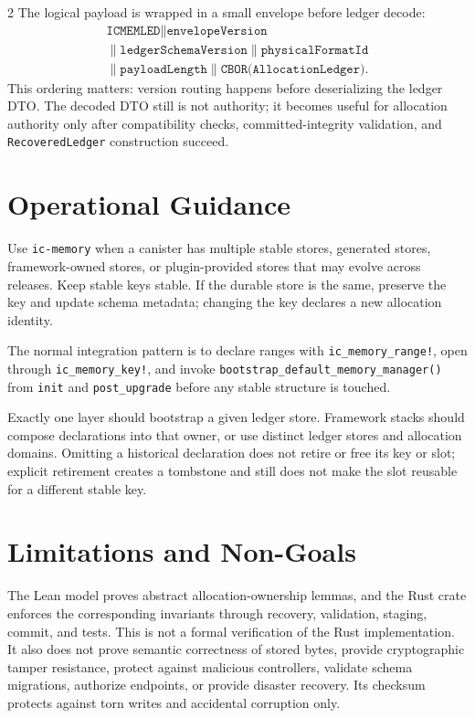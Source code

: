 \documentclass[11pt]{article}
\begin{document}
\begin{multicols}{2}
The logical payload is wrapped in a small envelope before ledger decode:
\[
  \begin{gathered}
  \texttt{ICMEMLED}
  \parallel \texttt{envelopeVersion}\\
  \parallel \texttt{ledgerSchemaVersion}
  \parallel \texttt{physicalFormatId}\\
  \parallel \texttt{payloadLength}
  \parallel
  \texttt{CBOR(AllocationLedger)}.
  \end{gathered}
\]
This ordering matters: version routing happens before deserializing the ledger
DTO. The decoded DTO still is not authority; it becomes useful for allocation
authority only after compatibility checks, committed-integrity validation, and
\texttt{RecoveredLedger} construction succeed.

\section{Operational Guidance}

Use \texttt{ic-memory} when a canister has multiple stable stores, generated
stores, framework-owned stores, or plugin-provided stores that may evolve across
releases. Keep stable keys stable. If the durable store is the same, preserve
the key and update schema metadata; changing the key declares a new allocation
identity.

The normal integration pattern is to declare ranges with
\texttt{ic\_memory\_range!}, open through \texttt{ic\_memory\_key!}, and invoke
\texttt{bootstrap\_default\_memory\_manager()} from \texttt{init} and
\texttt{post\_upgrade} before any stable structure is touched.

Exactly one layer should bootstrap a given ledger store. Framework stacks should
compose declarations into that owner, or use distinct ledger stores and
allocation domains. Omitting a historical declaration does not retire or free
its key or slot; explicit retirement creates a tombstone and still does not make
the slot reusable for a different stable key.

\section{Limitations and Non-Goals}

The Lean model proves abstract allocation-ownership lemmas, and the Rust crate
enforces the corresponding invariants through recovery, validation, staging,
commit, and tests. This is not a formal verification of the Rust implementation.
It also does not prove semantic correctness of stored bytes, provide
cryptographic tamper resistance, protect against malicious controllers, validate
schema migrations, authorize endpoints, or provide disaster recovery. Its
checksum protects against torn writes and accidental corruption only.


\end{multicols}
\end{document}

